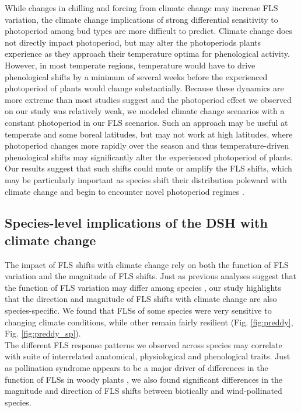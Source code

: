 \documentclass[12pt]{article}\usepackage[]{graphicx}\usepackage[]{color}
\begin{document}
\noindent While changes in chilling and forcing from climate change may increase FLS variation, the climate change implications of strong differential sensitivity to photoperiod among bud types are more difficult to predict. Climate change does not directly impact photoperiod, but may alter the photoperiods plants experience as they approach their temperature optima for phenological activity. However, in most temperate regions, temperature would have to drive phenological shifts by a minimum of several weeks before the experienced photoperiod of plants would change substantially. %
Because these dynamics are more extreme than most studies suggest \citep{Thackeray:2016aa} and the photoperiod effect we observed on our study was relatively weak, we modeled climate change scenarios with a constant photoperiod in our FLS scenarios. Such an approach may be useful at temperate and some boreal latitudes, but may not work at high latitudes, where photoperiod changes more rapidly over the season and thus temperature-driven phenological shifts may significantly alter the experienced photoperiod of plants. Our results suggest that such shifts could mute or amplify the FLS shifts, which may be particularly important as species shift their distribution poleward with climate change and begin to encounter novel photoperiod regimes \citep{WAY:2015aa}.\\

\subsection*{Species-level implications of the DSH with climate change}
\noindent The impact of FLS shifts with climate change rely on both the function of FLS variation and the magnitude of FLS shifts. Just as previous analyses suggest that the function of FLS variation may differ among species \citep{Buonaiuto2020,Gougherty2018}, our study highlights that the direction and magnitude of FLS shifts with climate change are also species-specific. We found that FLSs of some species were very sensitive to changing climate conditions, while other remain fairly resilient (Fig. \ref{fig:preddy}, Fig. \ref{fig:preddy_sp}).\\

\noindent The different FLS response patterns we observed across species may correlate with suite of interrelated anatomical, physiological and phenological traits. Just as pollination syndrome appears to be a major driver of differences in the function of FLSs in woody plants \citep{Buonaiuto2020}, we also found significant differences in the magnitude and direction of FLS shifts between biotically and wind-pollinated species.\\
\end{document}
